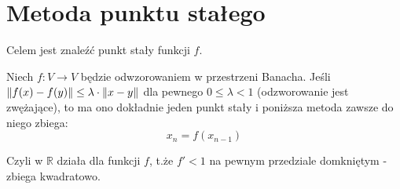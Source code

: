 \section{Metoda punktu stałego}
Celem jest znaleźć punkt stały funkcji \( f \).

\begin{theorem} 
	Niech \( f: V \rightarrow V \) będzie odwzorowaniem w przestrzeni Banacha. Jeśli \( \left\Vert f(x) - f(y) \right\Vert \leq \lambda \cdot \left\Vert x - y \right\Vert \) dla pewnego \( 0 \leq \lambda < 1 \) (odzworowanie jest zwężające), to ma ono dokładnie jeden punkt stały i poniższa metoda zawsze do niego zbiega: \\
	\[
		x_n = f(x_{n-1})
	\]
\end{theorem}

Czyli w \( \mathbb{R} \) działa dla funkcji \( f \), t.że \( f' < 1 \) na pewnym przedziale domkniętym - zbiega kwadratowo. \\